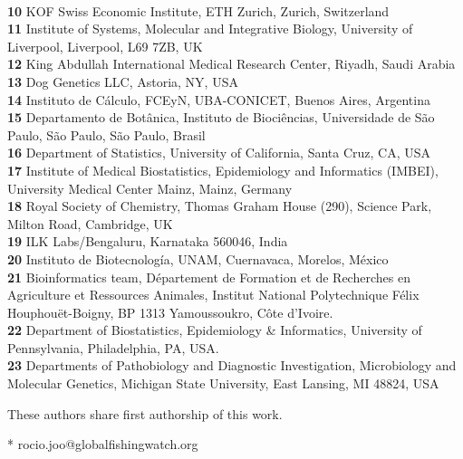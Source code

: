 \documentclass[10pt,letterpaper]{article}
\begin{document}
\begin{flushleft}
\\
\textbf{10} KOF Swiss Economic Institute, ETH Zurich, Zurich, Switzerland
\\
\textbf{11} Institute of Systems, Molecular and Integrative Biology, University of Liverpool, Liverpool, L69 7ZB, UK
\\
\textbf{12} King Abdullah International Medical Research Center, Riyadh, Saudi Arabia
\\
\textbf{13} Dog Genetics LLC, Astoria, NY, USA
\\
\textbf{14} Instituto de Cálculo, FCEyN, UBA-CONICET, Buenos Aires, Argentina
\\
\textbf{15} Departamento de Botânica, Instituto de Biociências, Universidade de São Paulo, São Paulo, São Paulo, Brasil
\\
\textbf{16} Department of Statistics, University of California, Santa Cruz, CA, USA
\\
\textbf{17} Institute of Medical Biostatistics, Epidemiology and Informatics (IMBEI), University Medical Center Mainz, Mainz, Germany
\\
\textbf{18} Royal Society of Chemistry, Thomas Graham House (290), Science Park, Milton Road, Cambridge, UK
\\
\textbf{19} ILK Labs/Bengaluru, Karnataka 560046, India
\\
\textbf{20} Instituto de Biotecnología, UNAM, Cuernavaca, Morelos, México
\\
\textbf{21} Bioinformatics team, Département de Formation et de Recherches en Agriculture et Ressources Animales, Institut National Polytechnique Félix Houphouët-Boigny, BP 1313 Yamoussoukro, Côte d’Ivoire.
\\
\textbf{22} Department of Biostatistics, Epidemiology \& Informatics, University of Pennsylvania, Philadelphia, PA, USA.
\\
\textbf{23} Departments of Pathobiology and Diagnostic Investigation, Microbiology and Molecular Genetics, Michigan State University, East Lansing, MI 48824, USA
\\
\bigskip

% 
%
\Yinyang These authors share first authorship of this work.




* rocio.joo@globalfishingwatch.org

\end{flushleft}
\end{document}
